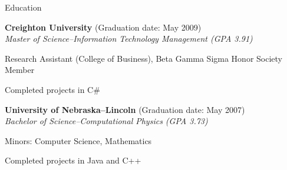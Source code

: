 \begin{Large}\textsf{Education}\end{Large} \vspace{-2mm}

\begin{itemize1}
	\item \textbf{Creighton University} (Graduation date: May 2009) \\
		\textit{Master of Science--Information Technology Management (GPA 3.91)} \vspace{-1.5mm}
		\begin{itemize1}			
			\item Research Assistant (College of Business), Beta Gamma Sigma Honor Society Member
			\item Completed projects in C\#
		\end{itemize1}
	\item \textbf{University of Nebraska--Lincoln} (Graduation date: May 2007) \\
		\textit{Bachelor of Science--Computational Physics (GPA 3.73)} \vspace{-1.5mm}
		\begin{itemize1}			
			\item Minors: Computer Science, Mathematics
			\item Completed projects in Java and C++
		\end{itemize1}
\end{itemize1}
